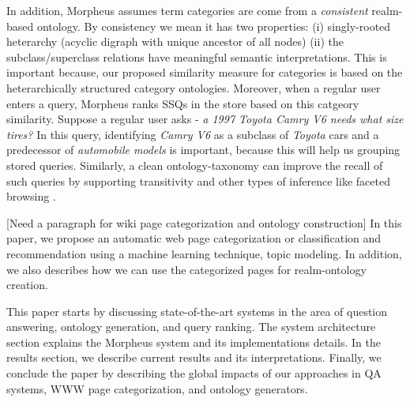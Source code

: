In addition, Morpheus assumes term categories are come from a
\textit{consistent} realm-based ontology. By consistency we mean it has two
properties: (i) singly-rooted heterarchy (acyclic digraph with unique 
ancestor of all nodes) (ii) the subclass/superclass relations have meaningful 
semantic interpretations. This is important because, our proposed similarity 
measure for categories is based on the heterarchically
structured category ontologies. Moreover, when a regular user enters a query,
Morpheus ranks SSQs in the store based on this catgeory similarity. Suppose a
regular user asks -\textit{ a 1997 Toyota Camry V6 needs what size tires?} In
this query, identifying \textit{Camry V6} as a subclass of \textit{Toyota} cars
and a predecessor of \textit{automobile models} is important, because this will
help us grouping stored queries. Similarly, a clean ontology-taxonomy can
improve the recall of such queries by supporting transitivity and other types of
inference like faceted browsing \cite{Wu2008}.   

[Need a paragraph for wiki page categorization and ontology construction]
In this paper, we propose an automatic web page categorization or 
classification and recommendation using a machine learning technique, topic modeling.
In addition, we also describes how we can use the categorized pages for realm-ontology 
creation.   

This paper starts by discussing state-of-the-art systems in the area of
question answering, ontology generation, and query ranking. The system
architecture section explains the Morpheus system and its implementations
details. In the results section, we describe current results and its
interpretations. Finally, we conclude the paper by describing the global impacts
of our approaches in QA systems, WWW page categorization, and ontology
generators.
